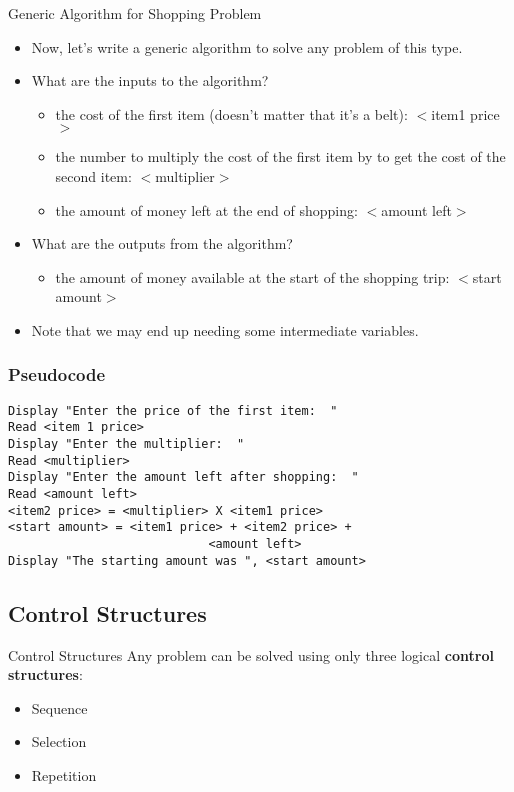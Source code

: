 \documentclass[graphics]{beamer}
\begin{document}
\begin{frame}{Generic Algorithm for Shopping Problem}
    \begin{itemize}
        \item Now, let’s write a generic algorithm to solve any problem of this type.
        \item What are the inputs to the algorithm?
        \begin{itemize}
            \item the cost of the first item (doesn’t matter that it’s a belt):  $<$item1 price$>$
            \item the number to multiply the cost of the first item by to get the cost of the second item:  $<$multiplier$>$
            \item the amount of money left at the end of shopping: $<$amount left$>$
        \end{itemize}
        \pause
        \item What are the outputs from the algorithm?
        \begin{itemize}
            \item the amount of money available at the start of the shopping trip: $<$start amount$>$
        \end{itemize}
        \item Note that we may end up needing some intermediate variables.
    \end{itemize}
\end{frame}

\begin{frame}[fragile]\frametitle{Pseudocode}
    \begin{verbatim}
Display "Enter the price of the first item:  "
Read <item 1 price>
Display "Enter the multiplier:  "
Read <multiplier>
Display "Enter the amount left after shopping:  "
Read <amount left>
<item2 price> = <multiplier> X <item1 price>
<start amount> = <item1 price> + <item2 price> +
                            <amount left>
Display "The starting amount was ", <start amount> 
    \end{verbatim}
\end{frame}

\subsection{Control Structures}
\begin{frame}{Control Structures}
    Any problem can be solved using only three logical \textbf{control structures}:
    \begin{itemize}
        \item Sequence
        \item Selection
        \item Repetition
    \end{itemize}
\end{frame}
\end{document}
